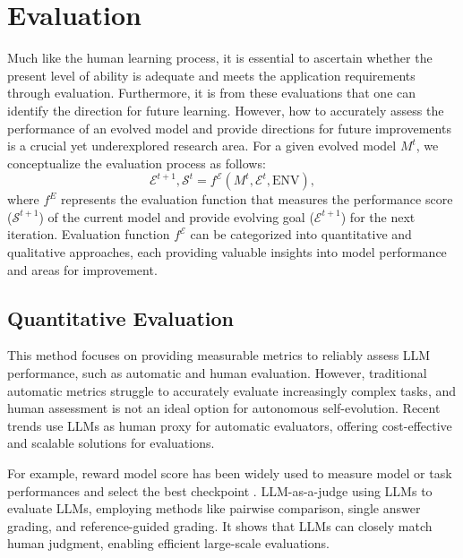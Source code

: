 \documentclass[sn-basic, Numbered]{sn-jnl}%
\def\gE{{\mathcal{E}}}
\def\gS{{\mathcal{S}}}
\theoremstyle{thmstyleone}%
\theoremstyle{thmstyletwo}%
\theoremstyle{thmstylethree}%
\begin{document}


\section{Evaluation}
\label{sec:evaluation}
Much like the human learning process, it is essential to ascertain whether the present level of ability is adequate and meets the application requirements through evaluation. Furthermore, it is from these evaluations that one can identify the direction for future learning.
However, how to accurately assess the performance of an evolved model and provide directions for future improvements is a crucial yet underexplored research area. For a given evolved model $M^t$, we conceptualize the evaluation process as follows:
\begin{equation}
  \gE^{t+1}, \gS^{t} = f^{\gE}(M^t, \gE^{t}, \mathrm{ENV}),
\end{equation}
where $f^E$ represents the evaluation function that measures the performance score ($\gS^{t+1}$) of the current model and provide evolving goal ($\gE^{t+1}$) for the next iteration. Evaluation function $f^\gE$ can be categorized into quantitative and qualitative approaches, each providing valuable insights into model performance and areas for improvement.

\subsection{Quantitative Evaluation}
This method focuses on providing measurable metrics to reliably assess LLM performance, such as automatic \cite{papineni2002bleu, lin2004rouge} and human evaluation. However, traditional automatic metrics struggle to accurately evaluate increasingly complex tasks, and human assessment is not an ideal option for autonomous self-evolution. Recent trends use LLMs as human proxy for automatic evaluators, offering cost-effective and scalable solutions for evaluations. 

For example, reward model score has been widely used to measure model or task performances \cite{shinn2023reflexion} and select the best checkpoint \cite{ouyang2022training}. LLM-as-a-judge \cite{zheng2024judging} using LLMs to evaluate LLMs, employing methods like pairwise comparison, single answer grading, and reference-guided grading. It shows that LLMs can closely match human judgment, enabling efficient large-scale evaluations.
\end{document}
